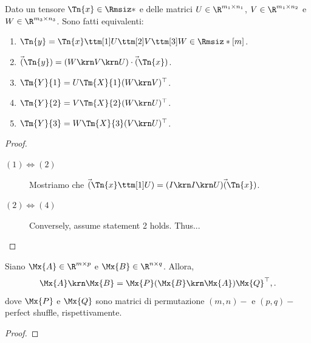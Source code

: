 \begin{proposition}
  Dato un tensore $ \Tn{x} \in \Rmsiz* $ e delle matrici $ U \in \R^{m_1 \times n_1} $, $ V \in
  \R^{m_1 \times n_2} $ e $ W \in \R^{m_3 \times n_3} $. Sono fatti equivalenti:
  \begin{enumerate}[label=(\roman*)]
    \item $\Tn{y} = \Tn{x} \ttm[1] U \ttm[2] V \ttm[3] W \in \Rmsiz*[m]$.
    \item $\vec(\Tn{y}) = (W \krn V \krn U) \cdot \vec(\Tn{x})$.
    \item $\Tm{Y}{1} = U\Tm{X}{1}(W \krn V)^{\top}$.
    \item $ \Tm{Y}{2} = V\Tm{X}{2}(W \krn U)^{\top} $.
    \item $\Tm{Y}{3} = W\Tm{X}{3}(V \krn U)^{\top}$.
  \end{enumerate}
\end{proposition}
\begin{proof}
\begin{description}
        \item[$(1) \iff (2)$] Mostriamo che $\vec(\Tn{x} \ttm[1] U) = (I \krn I \krn U)
          \vec(\Tn{x})$.
        \item[$(2) \iff (4)$] Conversely, assume statement 2 holds. Thus...
    \end{description}
\end{proof}

\begin{proposition}
  Siano $ \Mx{A} \in \R^{m \times p} $ e $ \Mx{B} \in \R^{n \times q} $. Allora, 
  \[
  \Mx{A} \krn \Mx{B} = \Mx{P}(\Mx{B} \krn \Mx{A})\Mx{Q}^{\top},
  .\] 
  dove $ \Mx{P} $ e $ \Mx{Q} $ sono matrici di permutazione $ (m,n)- $ e $ (p,q)- $ perfect shuffle, rispettivamente.
\end{proposition}
\begin{proof}

\end{proof}


